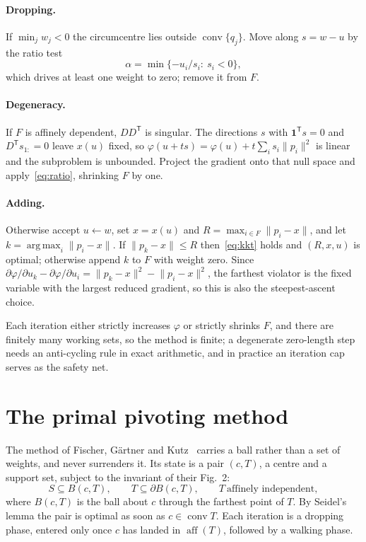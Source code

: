 \documentclass[10pt,a4paper]{article}
\theoremstyle{plain}
\DeclareMathOperator{\conv}{conv}
\DeclareMathOperator{\aff}{aff}
\DeclareMathOperator*{\argmax}{arg\,max}
\newcommand{\norm}[1]{\lVert #1 \rVert}
\newcommand{\T}{^{\mathsf{T}}}
\begin{document}
\paragraph{Dropping.} If $\min_j w_j<0$ the circumcentre lies outside
$\conv\{q_j\}$. Move along $s=w-u$ by the ratio test
\begin{equation}
  \label{eq:ratio}
  \alpha=\min\{-u_i/s_i:\ s_i<0\},
\end{equation}
which drives at least one weight to zero; remove it from $F$.

\paragraph{Degeneracy.} If $F$ is affinely dependent, $DD\T$ is singular. The
directions $s$ with $\mathbf{1}\T s=0$ and $D\T s_{1:}=0$ leave $x(u)$ fixed, so
$\varphi(u+ts)=\varphi(u)+t\sum_is_i\norm{p_i}^2$ is linear and the subproblem is
unbounded. Project the gradient onto that null space and apply~\eqref{eq:ratio},
shrinking $F$ by one.

\paragraph{Adding.} Otherwise accept $u\leftarrow w$, set $x=x(u)$ and
$R=\max_{i\in F}\norm{p_i-x}$, and let $k=\argmax_i\norm{p_i-x}$. If
$\norm{p_k-x}\le R$ then~\eqref{eq:kkt} holds and $(R,x,u)$ is optimal; otherwise
append $k$ to $F$ with weight zero. Since
$\partial\varphi/\partial u_k-\partial\varphi/\partial u_i
=\norm{p_k-x}^2-\norm{p_i-x}^2$, the farthest violator is the fixed variable with
the largest reduced gradient, so this is also the steepest-ascent choice.

Each iteration either strictly increases $\varphi$ or strictly shrinks $F$, and
there are finitely many working sets, so the method is finite; a degenerate
zero-length step needs an anti-cycling rule in exact arithmetic, and in practice an
iteration cap serves as the safety net.

\section{The primal pivoting method}
\label{sec:fgk}

The method of Fischer, G\"artner and Kutz~\cite{fischer2003} carries a ball rather
than a set of weights, and never surrenders it. Its state is a pair $(c,T)$, a
centre and a support set, subject to the invariant of their Fig.~2:
\begin{equation}
  \label{eq:fgk-invariant}
  S\subseteq B(c,T),\qquad T\subseteq\partial B(c,T),\qquad
  T\ \text{affinely independent},
\end{equation}
where $B(c,T)$ is the ball about $c$ through the farthest point of $T$. By
Seidel's lemma the pair is optimal as soon as $c\in\conv T$. Each iteration is a
dropping phase, entered only once $c$ has landed in $\aff(T)$, followed by a
walking phase.
\end{document}
